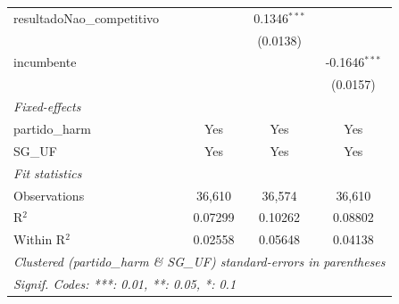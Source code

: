 \begin{tabular}{lccc}
   resultadoNao\_competitivo                  &                 & 0.1346$^{***}$  &   \\   
                                              &                 & (0.0138)        &   \\   
   incumbente                                 &                 &                 & -0.1646$^{***}$\\   
                                              &                 &                 & (0.0157)\\   
   \midrule
   \emph{Fixed-effects}\\
   partido\_harm                              & Yes             & Yes             & Yes\\  
   SG\_UF                                     & Yes             & Yes             & Yes\\  
   \midrule
   \emph{Fit statistics}\\
   Observations                               & 36,610          & 36,574          & 36,610\\  
   R$^2$                                      & 0.07299         & 0.10262         & 0.08802\\  
   Within R$^2$                               & 0.02558         & 0.05648         & 0.04138\\  
   \midrule \midrule
   \multicolumn{4}{l}{\emph{Clustered (partido\_harm \& SG\_UF) standard-errors in parentheses}}\\
   \multicolumn{4}{l}{\emph{Signif. Codes: ***: 0.01, **: 0.05, *: 0.1}}\\
\end{tabular}
\par\endgroup


